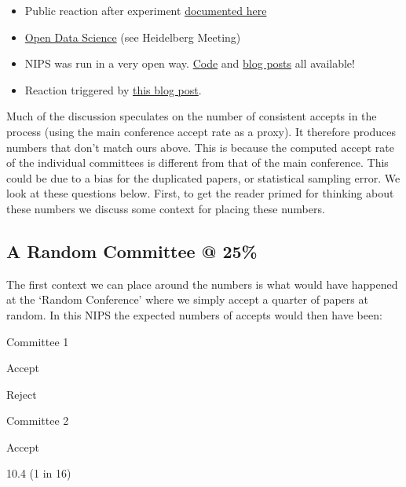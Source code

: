 \begin{itemize}
\item
  Public reaction after experiment
  \href{http://inverseprobability.com/2015/01/16/blogs-on-the-nips-experiment/}{documented
  here}
\item
  \href{http://inverseprobability.com/2014/07/01/open-data-science/}{Open
  Data Science} (see Heidelberg Meeting)
\item
  NIPS was run in a very open way.
  \href{https://github.com/sods/conference}{Code} and
  \href{http://inverseprobability.com/2014/12/16/the-nips-experiment/}{blog
  posts} all available!
\item
  Reaction triggered by
  \href{http://blog.mrtz.org/2014/12/15/the-nips-experiment.html}{this
  blog post}.
\end{itemize}

Much of the discussion speculates on the number of consistent accepts in
the process (using the main conference accept rate as a proxy). It
therefore produces numbers that don't match ours above. This is because
the computed accept rate of the individual committees is different from
that of the main conference. This could be due to a bias for the
duplicated papers, or statistical sampling error. We look at these
questions below. First, to get the reader primed for thinking about
these numbers we discuss some context for placing these numbers.

\hypertarget{a-random-committee-25}{%
\subsection{A Random Committee @ 25\%}\label{a-random-committee-25}}

\begin{flushright}
\end{flushright}

The first context we can place around the numbers is what would have
happened at the `Random Conference' where we simply accept a quarter of
papers at random. In this NIPS the expected numbers of accepts would
then have been:

Committee 1

Accept

Reject

Committee 2

Accept

10.4 (1 in 16)

